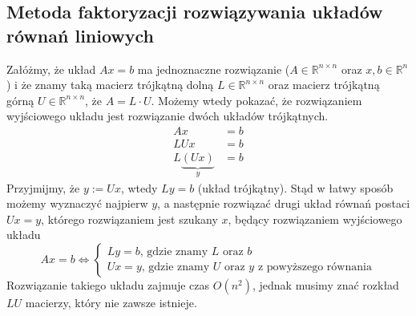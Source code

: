 \documentclass[a4paper,11pt]{article}
\begin{document}
\subsection{Metoda faktoryzacji rozwiązywania układów równań liniowych}
Załóżmy, że układ $Ax=b$ ma jednoznaczne rozwiązanie ($A\in \mathbb{R}^{n\times n}$ oraz $x, b \in \mathbb{R}^n$) i że znamy taką macierz trójkątną dolną $L \in \mathbb{R}^{n\times n}$ oraz macierz trójkątną górną $U \in \mathbb{R}^{n\times n}$, że $A = L\cdot U$. Możemy wtedy pokazać, że rozwiązaniem wyjściowego układu jest rozwiązanie dwóch układów trójkątnych.
\begin{align*}
Ax &= b \\
LUx &= b \\
L \underbrace{(Ux)}_{y} &= b
\end{align*}
\noindent Przyjmijmy, że $y:=Ux$, wtedy $Ly=b$ (układ trójkątny). Stąd w łatwy sposób możemy wyznaczyć najpierw $y$, a następnie rozwiązać drugi układ równań postaci $Ux=y$, którego rozwiązaniem jest szukany $x$, będący rozwiązaniem wyjściowego układu
$$
Ax=b \Leftrightarrow
\begin{cases}
Ly = b \text{, gdzie znamy } L \text{ oraz } b \\
Ux = y \text{, gdzie znamy } U \text{ oraz } y \text{ z powyższego równania}
\end{cases}
$$
\noindent Rozwiązanie takiego układu zajmuje czas $O(n^2)$, jednak musimy znać rozkład $LU$ macierzy, który nie zawsze istnieje.
\end{document}
